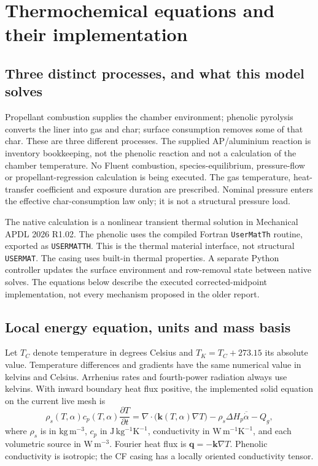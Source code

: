 \documentclass[oneside,openany]{amsdtx}
\begin{document}
\section{Thermochemical equations and their implementation}
\label{sec:physics-detail}
\subsection{Three distinct processes, and what this model solves}
Propellant combustion supplies the chamber environment; phenolic pyrolysis converts the liner into gas and char; surface consumption removes some of that char. These are three different processes. The supplied AP/aluminium reaction is inventory bookkeeping, not the phenolic reaction and not a calculation of the chamber temperature. No Fluent combustion, species-equilibrium, pressure-flow or propellant-regression calculation is being executed. The gas temperature, heat-transfer coefficient and exposure duration are prescribed. Nominal pressure enters the effective char-consumption law only; it is not a structural pressure load.

The native calculation is a nonlinear transient thermal solution in Mechanical APDL 2026 R1.02. The phenolic uses the compiled Fortran \texttt{UserMatTh} routine, exported as \texttt{USERMATTH}. This is the thermal material interface, not structural \texttt{USERMAT}. The casing uses built-in thermal properties. A separate Python controller updates the surface environment and row-removal state between native solves. The equations below describe the executed corrected-midpoint implementation, not every mechanism proposed in the older report.

\subsection{Local energy equation, units and mass basis}
Let $T_C$ denote temperature in degrees Celsius and $T_K=T_C+273.15$ its absolute value. Temperature differences and gradients have the same numerical value in kelvins and Celsius. Arrhenius rates and fourth-power radiation always use kelvins. With inward boundary heat flux positive, the implemented solid equation on the current live mesh is
\begin{equation}\label{eq:implemented-energy}
 \rho_s(T,\alpha)c_p(T,\alpha)\frac{\partial T}{\partial t}
 =\nabla\!\cdot\!\bigl(\boldsymbol{k}(T,\alpha)\nabla T\bigr)
 -\rho_s\Delta H_p\overline{\dot\alpha}-Q_g,
\end{equation}
where $\rho_s$ is in $\mathrm{kg\,m^{-3}}$, $c_p$ in $\mathrm{J\,kg^{-1}K^{-1}}$, conductivity in $\mathrm{W\,m^{-1}K^{-1}}$, and each volumetric source in $\mathrm{W\,m^{-3}}$. Fourier heat flux is $\boldsymbol q=-\boldsymbol k\nabla T$. Phenolic conductivity is isotropic; the CF casing has a locally oriented conductivity tensor.
\end{document}

